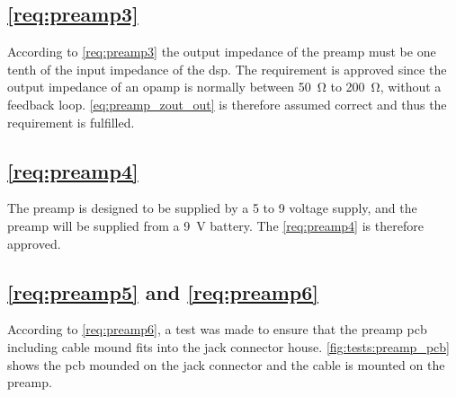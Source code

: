 %
%

\subsection{\autoref{req:preamp3}}
According to \autoref{req:preamp3} the output impedance of the preamp must be one tenth of the input impedance of the \gls{dsp}. The requirement is approved since the output impedance of an \gls{opamp} is normally between \SI{50}{\ohm} to \SI{200}{\ohm}, without a feedback loop. \autoref{eq:preamp_zout_out} is therefore assumed correct and thus the requirement is fulfilled.  

\subsection{\autoref{req:preamp4}}
The \gls{preamp} is designed to be supplied by a 5 to 9 voltage supply, and the \gls{preamp} will be supplied from a \SI{9}{\volt} battery. The \autoref{req:preamp4} is therefore approved.

\subsection{\autoref{req:preamp5} and \autoref{req:preamp6}}
According to \autoref{req:preamp6}, a test was made to ensure that the \gls{preamp} \gls{pcb} including cable mound fits into the jack connector house. \autoref{fig:tests:preamp_pcb} shows the \gls{pcb} mounded on the jack connector and the cable is mounted on the \gls{preamp}. 

